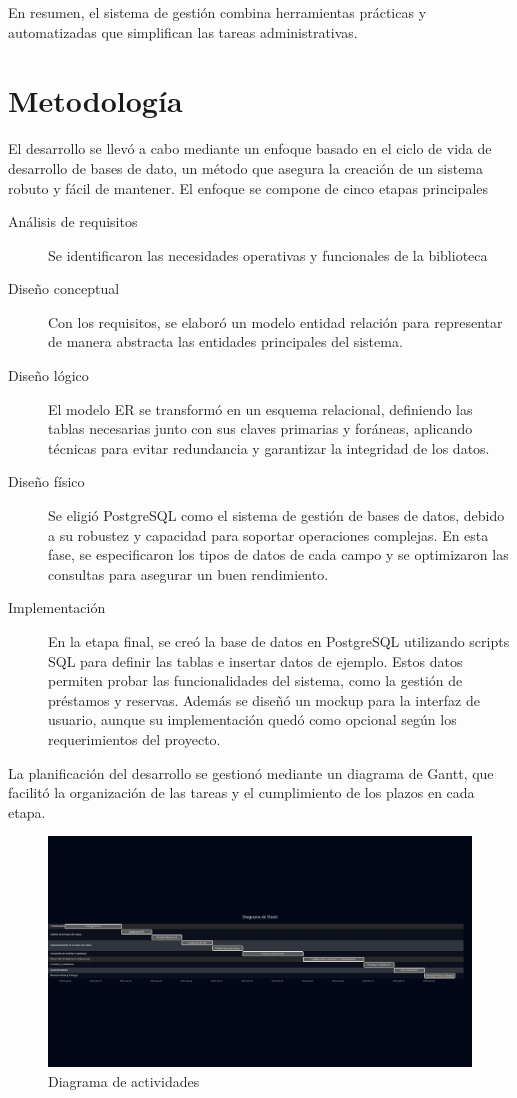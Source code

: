 \documentclass[12pt, a4paper]{article}
\begin{document}
En resumen, el sistema de gestión combina herramientas prácticas y automatizadas que simplifican las tareas administrativas.

\section{Metodología}
El desarrollo se llevó a cabo mediante un enfoque basado en el ciclo de vida de desarrollo de bases de dato, un método que asegura la creación de un sistema robuto y fácil de mantener. El enfoque se compone de cinco etapas principales

\begin{description}
 \item [Análisis de requisitos] Se identificaron las necesidades operativas y funcionales de la biblioteca
 \item [Diseño conceptual] Con los requisitos, se elaboró un modelo entidad relación para representar de manera abstracta las entidades principales del sistema.
 \item [Diseño lógico] El modelo ER se transformó en un esquema relacional, definiendo las tablas necesarias junto con sus claves primarias y foráneas, aplicando técnicas para evitar redundancia y garantizar la integridad de los datos.
 \item [Diseño físico] Se eligió PostgreSQL como el sistema de gestión de bases de datos, debido a su robustez y capacidad para soportar operaciones complejas. En esta fase, se especificaron los tipos de datos de cada campo y se optimizaron las consultas para asegurar un buen rendimiento.
 \item [Implementación] En la etapa final, se creó la base de datos en PostgreSQL utilizando scripts SQL para definir las tablas e insertar datos de ejemplo. Estos datos permiten probar las funcionalidades del sistema, como la gestión de préstamos y reservas. Además se diseñó un mockup para la interfaz de usuario, aunque su implementación quedó como opcional según los requerimientos del proyecto.
\end{description}

La planificación del desarrollo se gestionó mediante un diagrama de Gantt, que facilitó la organización de las tareas y el cumplimiento de los plazos en cada etapa.

\begin{figure}[htbp]
    \centering
    \includegraphics[width=\textwidth]{gantt.png}
    \caption{Diagrama de actividades}
\end{figure}
\end{document}
